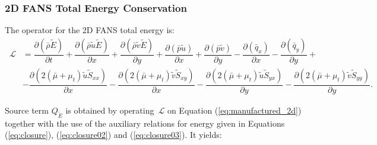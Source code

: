 \documentclass[10pt]{article}
\newcommand{\Diff}[2] {\dfrac{\partial( #1)}{\partial #2}}
\newcommand{\Lo}{\,\mathcal{L}}
\newcommand{\brho}{\bar{\rho}}
\newcommand{\bp}{\bar{p}}
\newcommand{\bq}{\bar{q}}
\newcommand{\tu}{\tilde{u}}
\newcommand{\tv}{\tilde{v}}
\newcommand{\tS}{\tilde{S}}
\newcommand{\tE}{\tilde{E}}
\newcommand{\bmu}{\bar{\mu}}
\begin{document}
\subsubsection{2D FANS Total Energy Conservation}

The operator for the 2D FANS total energy is:
\begin{equation*}
\begin{split}
\Lo&=  \Diff{\brho \tE }{t}+ \Diff{\brho \tu \tE }{x}+\Diff{\brho \tv \tE}{y}+\Diff{\bp\tu}{x} +\Diff{\bp\tv}{y} - \Diff{\bq_x}{x} -\Diff{\bq_y}{y} +\\
  &-\Diff{2(\bmu+\mu_t)\tu \tS_{xx}}{x}-\Diff{2(\bmu+\mu_t)\tv \tS_{xy}}{x}-\Diff{2(\bmu+\mu_t) \tu \tS_{yx}}{y}-\Diff{2(\bmu+\mu_t)\tv \tS_{yy}}{y}.
\end{split}
\end{equation*}

Source term $Q_{\tE}$ is obtained by operating $\Lo$ on Equation  (\ref{eq:manufactured_2d}) together with the use of the  auxiliary relations for energy given in Equations (\ref{eq:closure}),  (\ref{eq:closure02}) and (\ref{eq:closure03}). It yields:
\end{document}
